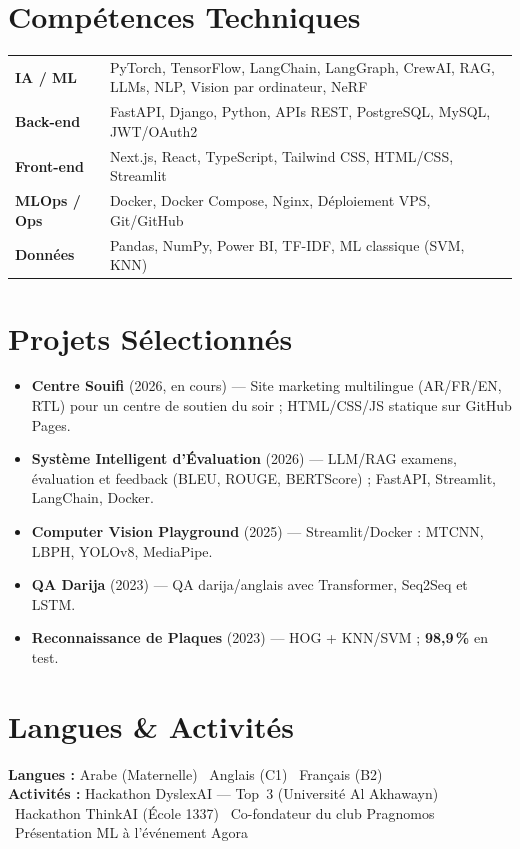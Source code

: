 \documentclass[10pt,a4paper]{article}
\begin{document}
\section*{Compétences Techniques}
\begin{tabularx}{\textwidth}{@{}>{\bfseries}l@{\hspace{0.6em}}X@{}}
IA / ML     & PyTorch, TensorFlow, LangChain, LangGraph, CrewAI, RAG, LLMs, NLP, Vision par ordinateur, NeRF \\
Back-end    & FastAPI, Django, Python, APIs REST, PostgreSQL, MySQL, JWT/OAuth2 \\
Front-end   & Next.js, React, TypeScript, Tailwind CSS, HTML/CSS, Streamlit \\
MLOps / Ops & Docker, Docker Compose, Nginx, Déploiement VPS, Git/GitHub \\
Données     & Pandas, NumPy, Power BI, TF-IDF, ML classique (SVM, KNN) \\
\end{tabularx}

\section*{Projets Sélectionnés}
\begin{itemize}
    \item \textbf{Centre Souifi} (2026, en cours) --- Site marketing multilingue (AR/FR/EN, RTL) pour un centre de soutien du soir ; HTML/CSS/JS statique sur GitHub Pages.
    \item \textbf{Système Intelligent d'Évaluation} (2026) --- LLM/RAG examens, évaluation et feedback (BLEU, ROUGE, BERTScore) ; FastAPI, Streamlit, LangChain, Docker.
    \item \textbf{Computer Vision Playground} (2025) --- Streamlit/Docker : MTCNN, LBPH, YOLOv8, MediaPipe.
    \item \textbf{QA Darija} (2023) --- QA darija/anglais avec Transformer, Seq2Seq et LSTM.
    \item \textbf{Reconnaissance de Plaques} (2023) --- HOG + KNN/SVM ; \textbf{98,9\,\%} en test.
\end{itemize}

\section*{Langues \& Activités}
\textbf{Langues :} Arabe (Maternelle) \textbullet\ Anglais (C1) \textbullet\ Français (B2)\\[2pt]
\textbf{Activités :} Hackathon DyslexAI --- Top~3 (Université Al Akhawayn) \textbullet\
Hackathon ThinkAI (École 1337) \textbullet\
Co-fondateur du club Pragnomos \textbullet\
Présentation ML à l'événement Agora
\end{document}
